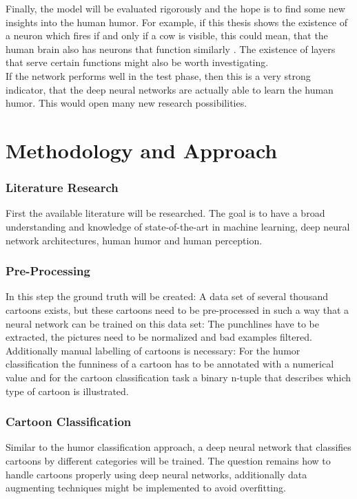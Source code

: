 \documentclass[draft,final]{vutinfth} %
\begin{document}
Finally, the model will be evaluated rigorously and the hope is to find some new insights into the human humor. For example, if this thesis shows the existence of a neuron which fires if and only if a cow is visible, this could mean, that the human brain also has neurons that function similarly \cite{Cichy2016}. The existence of layers that serve certain functions might also be worth investigating. \\

If the network performs well in the test phase, then this is a very strong indicator, that the deep neural networks are actually able to learn the human humor. This would open many new research possibilities. \\

\chapter{Methodology and Approach}
\subsection {Literature Research}
First the available literature will be researched. The goal is to have a broad understanding and knowledge of state-of-the-art in machine learning, deep neural network architectures, human humor and human perception. \\

\subsection {Pre-Processing}
In this step the ground truth will be created: A data set of several thousand cartoons exists, but these cartoons need to be pre-processed in such a way that a neural network can be trained on this data set: The punchlines have to be extracted, the pictures need to be normalized and bad examples filtered. Additionally manual labelling of cartoons is necessary: For the humor classification the funniness of a cartoon has to be annotated with a numerical value and for the cartoon classification task a binary n-tuple that describes which type of cartoon is illustrated. \\

\subsection {Cartoon Classification}

Similar to the humor classification approach, a deep neural network that classifies cartoons by different categories will be trained. The question remains how to handle cartoons properly using deep neural networks, additionally data augmenting techniques might be implemented to avoid overfitting. \\
\end{document}
